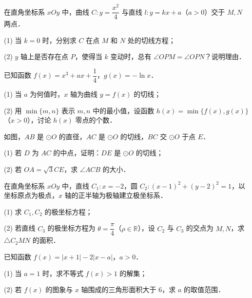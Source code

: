 \begin{question}
在直角坐标系 $xOy$ 中，曲线 $C:y=\dfrac{x^2}{4}$ 与直线 $l:y=kx+a$（$a>0$）交于 $M,N$ 两点．

(1) 当 $k=0$ 时，分别求 $C$ 在点 $M$ 和 $N$ 处的切线方程；

(2) $y$ 轴上是否存在点 $P$，使得当 $k$ 变动时，总有 $\angle OPM=\angle OPN$？说明理由．

\end{question}
\begin{question}
已知函数 $f(x)=x^3+ax+\dfrac14$，$g(x)=-\ln x$．

(1) 当 $a$ 为何值时，$x$ 轴为曲线 $y=f(x)$ 的切线；

(2) 用 $\min\{m,n\}$ 表示 $m,n$ 中的最小值，设函数 $h(x)=\min\{f(x),g(x)\}$（$x>0$），讨论 $h(x)$ 零点的个数．

\Needspace{0.4\textheight}
\end{question}
\begin{question}
如图，$AB$ 是 $\odot O$ 的直径，$AC$ 是 $\odot O$ 的切线，$BC$ 交 $\odot O$ 于点 $E$．
\nopagebreak[4]
\begin{center}\end{center}
\nopagebreak[4]
(1) 若 $D$ 为 $AC$ 的中点，证明：$DE$ 是 $\odot O$ 的切线；

(2) 若 $OA=\sqrt3 CE$，求 $\angle ACB$ 的大小．

\end{question}
\begin{question}
在直角坐标系 $xOy$ 中，直线 $C_1:x=-2$，圆 $C_2:(x-1)^2+(y-2)^2=1$，以坐标原点为极点，$x$ 轴的正半轴为极轴建立极坐标系．

(1) 求 $C_1,C_2$ 的极坐标方程；

(2) 若直线 $C_3$ 的极坐标方程为 $\theta=\dfrac\pi4$（$\rho\in\mathbb R$），设 $C_2$ 与 $C_3$ 的交点为 $M,N$，求 $\triangle C_2MN$ 的面积．

\end{question}
\begin{question}
已知函数 $f(x)=|x+1|-2|x-a|$，$a>0$．

(1) 当 $a=1$ 时，求不等式 $f(x)>1$ 的解集；

(2) 若 $f(x)$ 的图象与 $x$ 轴围成的三角形面积大于 $6$，求 $a$ 的取值范围．

\end{question}